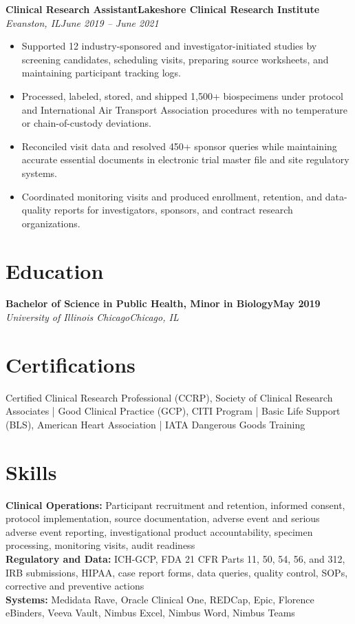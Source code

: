\documentclass[10pt,letterpaper]{article}
\newcommand{\job}[4]{%
  \textbf{#1}\hfill\textbf{#2}\\[-1pt]
  \textit{#3}\hfill\textit{#4}\par
}
\begin{document}
\job{Clinical Research Assistant}{Lakeshore Clinical Research Institute}{Evanston, IL}{June 2019 -- June 2021}
\begin{itemize}
  \item Supported 12 industry-sponsored and investigator-initiated studies by screening candidates, scheduling visits, preparing source worksheets, and maintaining participant tracking logs.
  \item Processed, labeled, stored, and shipped 1,500+ biospecimens under protocol and International Air Transport Association procedures with no temperature or chain-of-custody deviations.
  \item Reconciled visit data and resolved 450+ sponsor queries while maintaining accurate essential documents in electronic trial master file and site regulatory systems.
  \item Coordinated monitoring visits and produced enrollment, retention, and data-quality reports for investigators, sponsors, and contract research organizations.
\end{itemize}

\section*{Education}
\textbf{Bachelor of Science in Public Health, Minor in Biology}\hfill\textbf{May 2019}\\[-1pt]
\textit{University of Illinois Chicago}\hfill\textit{Chicago, IL}

\section*{Certifications}
Certified Clinical Research Professional (CCRP), Society of Clinical Research Associates \enspace|\enspace
Good Clinical Practice (GCP), CITI Program \enspace|\enspace
Basic Life Support (BLS), American Heart Association \enspace|\enspace
IATA Dangerous Goods Training

\section*{Skills}
\textbf{Clinical Operations:} Participant recruitment and retention, informed consent, protocol implementation, source documentation, adverse event and serious adverse event reporting, investigational product accountability, specimen processing, monitoring visits, audit readiness\\
\textbf{Regulatory and Data:} ICH-GCP, FDA 21 CFR Parts 11, 50, 54, 56, and 312, IRB submissions, HIPAA, case report forms, data queries, quality control, SOPs, corrective and preventive actions\\
\textbf{Systems:} Medidata Rave, Oracle Clinical One, REDCap, Epic, Florence eBinders, Veeva Vault, Nimbus Excel, Nimbus Word, Nimbus Teams
\end{document}
